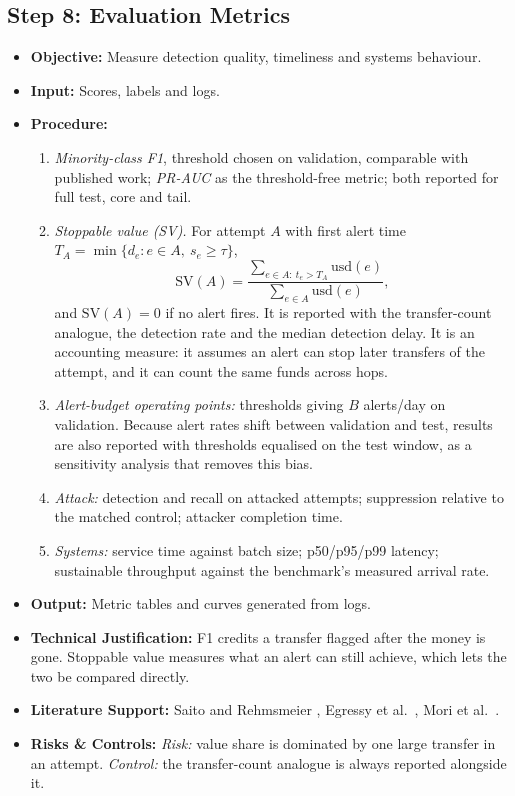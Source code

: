 \documentclass[11pt,a4paper]{article}
\begin{document}
\subsection{Step 8: Evaluation Metrics}
\begin{itemize}[leftmargin=*]
    \item \textbf{Objective:} Measure detection quality, timeliness and systems behaviour.
    \item \textbf{Input:} Scores, labels and logs.
    \item \textbf{Procedure:}
    \begin{enumerate}[leftmargin=*]
        \item \textit{Minority-class F1}, threshold chosen on validation, comparable with published work; \textit{PR-AUC} \cite{saito2015prroc} as the threshold-free metric; both reported for full test, core and tail.
        \item \textit{Stoppable value (SV).} For attempt $A$ with first alert time $T_A=\min\{d_e : e\in A,\ s_e\ge\tau\}$,
        \begin{equation}
            \mathrm{SV}(A)=\frac{\sum_{e\in A:\ t_e>T_A} \mathrm{usd}(e)}{\sum_{e\in A}\mathrm{usd}(e)},
        \end{equation}
        and $\mathrm{SV}(A)=0$ if no alert fires. It is reported with the transfer-count analogue, the detection rate and the median detection delay. It is an accounting measure: it assumes an alert can stop later transfers of the attempt, and it can count the same funds across hops.
        \item \textit{Alert-budget operating points:} thresholds giving $B$ alerts/day on validation. Because alert rates shift between validation and test, results are also reported with thresholds equalised on the test window, as a sensitivity analysis that removes this bias.
        \item \textit{Attack:} detection and recall on attacked attempts; suppression relative to the matched control; attacker completion time.
        \item \textit{Systems:} service time against batch size; p50/p95/p99 latency; sustainable throughput against the benchmark's measured arrival rate.
    \end{enumerate}
    \item \textbf{Output:} Metric tables and curves generated from logs.
    \item \textbf{Technical Justification:} F1 credits a transfer flagged after the money is gone. Stoppable value measures what an alert can still achieve, which lets the two be compared directly.
    \item \textbf{Literature Support:} Saito and Rehmsmeier \cite{saito2015prroc}, Egressy et al.\ \cite{egressy2024multigraph}, Mori et al.\ \cite{mori2018early}.
    \item \textbf{Risks \& Controls:} \textit{Risk:} value share is dominated by one large transfer in an attempt. \textit{Control:} the transfer-count analogue is always reported alongside it.
\end{itemize}
\end{document}
